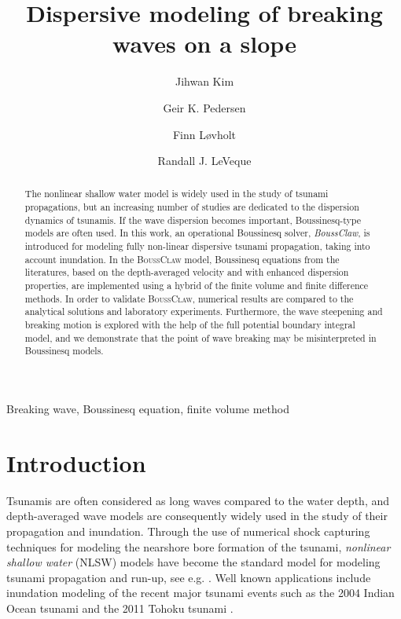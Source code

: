 \documentclass[review]{elsarticle}
\begin{document}
\begin{frontmatter}

\title{Dispersive modeling of breaking waves  on a slope}

\author[1]{Jihwan Kim}
\author[1]{Geir K. Pedersen}
\author[1,2]{Finn L{\o}vholt}
\author[3]{Randall J. LeVeque}

\address[1]{University of Oslo, Department of Mathematics, 
Oslo, Norway}
\address[2]{Norwegian Geotechnical Institute,
Oslo, Norway}
\address[3]{University of Washington, Department of Applied Mathematics, Seattle, USA}

\begin{abstract}

The nonlinear shallow water model is widely used
in the study of tsunami propagations,
but an increasing number of studies 
are dedicated to the dispersion dynamics of tsunamis.
If the wave dispersion becomes important,
Boussinesq-type models are often used. 
In this work, an operational Boussinesq solver, 
{\em BoussClaw}, is introduced
for modeling fully non-linear dispersive tsunami propagation, 
taking into account inundation. 
In the \textsc{BoussClaw} model,
Boussinesq equations from the literatures, 
based on the depth-averaged velocity 
and with enhanced dispersion properties, 
are implemented using a hybrid of the finite volume
and finite difference methods.
In order to validate \textsc{BoussClaw}, 
numerical results are compared 
to the analytical solutions and laboratory experiments. 
Furthermore, the  wave steepening and breaking motion
is explored with the help of the full potential 
boundary integral model, 
and we demonstrate that the point of wave breaking
may be misinterpreted in Boussinesq models. 

\end{abstract}

\begin{keyword}
Breaking wave, Boussinesq equation, finite volume method
\end{keyword}

\end{frontmatter}

\linenumbers

\section{Introduction}

Tsunamis are often considered as long waves compared to the water depth, and 
depth-averaged wave models are consequently widely used in the study of their propagation and inundation.
Through the use of numerical shock capturing techniques for modeling
the nearshore bore formation of the tsunami, {\em nonlinear shallow water} (NLSW) models
have become the standard model for modeling tsunami propagation and run-up, see e.g. 
\citep{titov1995modeling,Imamura1996b,Harig2008,BergerGeorgeLeVequeMandli11}.
Well known applications include inundation modeling of the recent major tsunami events 
such as the 2004 Indian Ocean tsunami \citep{Borrero2006,Kaiser2011} and the 2011 Tohoku tsunami \citep{Hooper2013,Romano2014}. 
\end{document}
